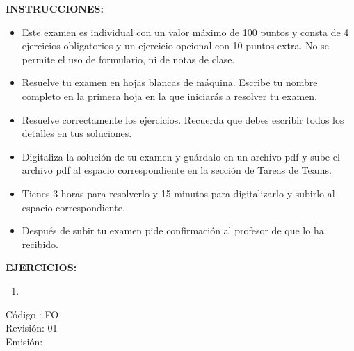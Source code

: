 \documentclass[letterpaper,12pt]{memoir}
\begin{document}
\titulo

\textbf{INSTRUCCIONES:} 
\begin{itemize}
	\item Este examen es individual con un valor m\'aximo de 100 puntos y consta de 4 ejercicios obligatorios y un ejercicio opcional con 10 puntos extra. No se permite el uso de formulario, ni de notas de clase.
	\item Resuelve tu examen en hojas blancas de m\'aquina. Escribe tu nombre completo en la primera hoja en la que iniciar\'as a resolver tu examen.
	\item Resuelve correctamente los ejercicios. Recuerda que debes escribir todos los detalles en tus soluciones.
	\item Digitaliza la soluci\'on de tu examen y gu\'ardalo en un archivo pdf y sube el archivo pdf al espacio correspondiente en la secci\'on de Tareas de Teams.
	\item Tienes 3 horas para resolverlo y 15 minutos para digitalizarlo y subirlo al espacio correspondiente.
	\item Despu\'es de subir tu examen pide confirmaci\'on al profesor de que lo ha recibido.
\end{itemize}

\textbf{EJERCICIOS:}

\begin{enumerate}
	\item 
\end{enumerate}

\begin{flushright}
	C\'odigo : FO-\\
	Revisi\'on: 01\\
	Emisi\'on:
\end{flushright}
\end{document}
